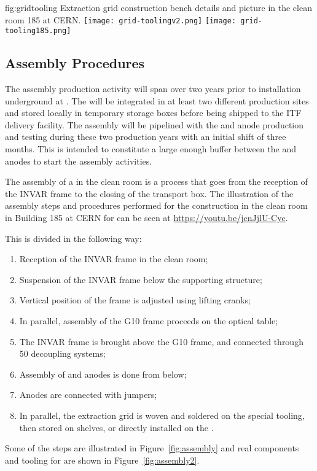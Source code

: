 \begin{dunefigure}{fig:gridtooling}
{Extraction grid construction bench details and picture in the clean room 185 at CERN.}
\texttt{[image: grid-toolingv2.png]}
\texttt{[image: grid-tooling185.png]}
\end{dunefigure}

\subsection{Assembly Procedures}
\label{sec:fddp-crp-assy}

The  assembly production activity will span over two years 
 prior to  installation underground at \surf. The  will be integrated in at least two different production sites and stored locally in temporary storage boxes before being shipped to the ITF delivery facility. The  assembly will be pipelined with the  and anode production and testing during these two production years with an initial  shift of three months. This is intended to constitute a large enough buffer between the  and anodes to start the  assembly activities.

The assembly of a  in the clean room is a process that goes from the reception of the INVAR frame to the  closing of the transport box. 
The illustration of the assembly steps and procedures performed for the   construction in the clean room in Building 185 at CERN for  can be seen at \url{https://youtu.be/jcnJjlU-Cyc}.

This is divided in the following way:
\begin{enumerate}
\item Reception of the INVAR frame in the clean room;
\item  Suspension of the INVAR frame below the supporting structure;
\item  Vertical position of the frame is adjusted using lifting cranks;
\item  In parallel, assembly of the G10 frame proceeds on the optical table;
\item  The INVAR frame is brought above the G10 frame, and connected through \num{50} decoupling systems;
\item  Assembly of  and anodes is done from below;
\item  Anodes are connected with jumpers;
\item  In parallel, the extraction grid is woven and soldered on the special tooling, then stored on shelves, or directly installed on the .
\end{enumerate}
Some of the steps are illustrated in Figure~\ref{fig:assembly} and real components and tooling for  are shown in Figure~\ref{fig:assembly2}.

